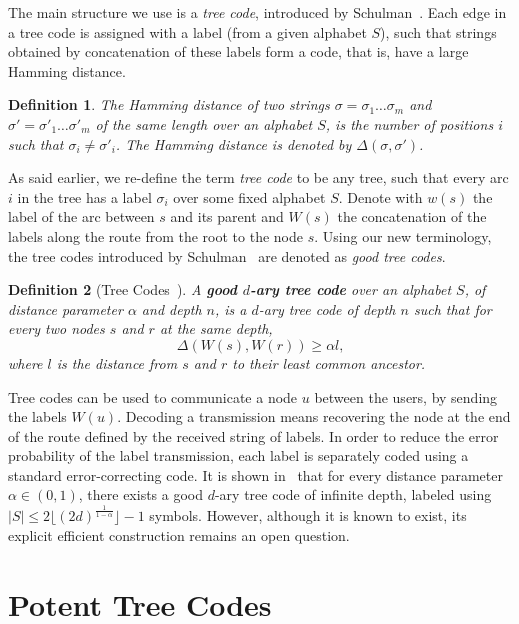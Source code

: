 \documentclass[ letterpaper, 11pt]{article}
\newtheorem{definition}{Definition}
\begin{document}
The main structure we use is a \emph{tree code}, introduced by Schulman~\cite{schulman93,schulman96}.
Each edge in a tree code is assigned with a label (from a given alphabet $S$),
such that strings obtained by concatenation of these labels
form a code, that is, have a large Hamming distance.

\begin{definition}
The Hamming distance of two strings $\sigma=\sigma_1\ldots\sigma_m$ and
$\sigma'=\sigma'_1\ldots\sigma'_m$ of the same length over an alphabet $S$,
is the number of positions $i$ such that $\sigma_i \ne \sigma'_i$.
The Hamming distance is denoted by $\Delta(\sigma,\sigma')$.
\end{definition}

As said earlier, we re-define the term \emph{tree code} to be any tree, such that
every arc $i$ in the tree has a label $\sigma_i$ over some fixed alphabet $S$.
Denote with $w(s)$ the label of the arc between
$s$ and its parent and $W(s)$ the concatenation of the labels along the
route from the root to the node $s$. Using our new terminology,
the tree codes introduced by Schulman~\cite{schulman96}
are denoted as \emph{good tree codes}.
\begin{definition}[Tree Codes~\cite{schulman96}] \label{def:TreeCode}
A  \textbf{good $d$-ary tree code} over an alphabet $S$, of distance parameter $\alpha$ and depth $n$,
is a $d$-ary tree code of depth $n$ such that
for every two nodes $s$ and $r$ at the same depth,
$$\Delta(W(s),W(r)) \ge \alpha l\text{,}$$
where $l$ is the distance from $s$ and $r$ to their least common ancestor.
\end{definition}
Tree codes can be used to communicate a node $u$ between the users, by sending the labels
$W(u)$. Decoding a transmission means recovering the node at the end of
the route defined by the received string of labels.
In order to reduce the error probability of the label
transmission, each label is separately coded using a standard error-correcting code.
It is shown in~\cite{schulman96} that for every distance parameter $\alpha\in(0,1)$, there exists a good $d$-ary tree code of infinite depth, labeled using  $|S|\le 2\lfloor (2d)^{\frac{1}{1-\alpha}}\rfloor-1$ symbols.
However, although it is known to exist, its explicit efficient construction
remains an open question.




\section{Potent Tree Codes}\label{sec:potent} 
\end{document}
